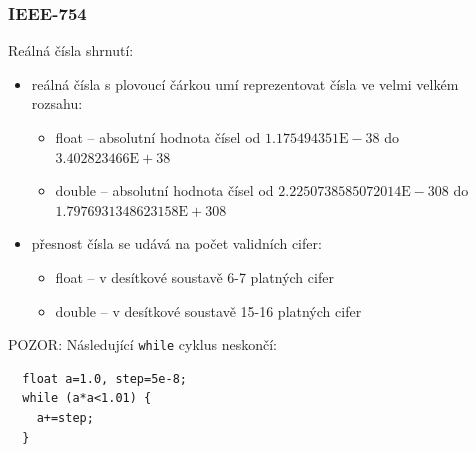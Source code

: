 \begin{frame}[fragile]
\frametitle{IEEE-754}

Reálná čísla shrnutí:
\begin{itemize}
\item reálná čísla s plovoucí čárkou umí reprezentovat čísla ve velmi velkém rozsahu:
\begin{itemize}
\item float -- absolutní hodnota čísel od $1.175494351\text{E}-38$ do $3.402823466\text{E} + 38$
\item double -- absolutní hodnota čísel od $2.2250738585072014\text{E} - 308$ do $1.7976931348623158\text{E} + 308$
\end{itemize}
\item přesnost čísla se udává na počet validních cifer:
\begin{itemize}
\item float -- v desítkové soustavě 6-7 platných cifer
\item double -- v desítkové soustavě 15-16 platných cifer
\end{itemize}
\end{itemize}

POZOR: Následující \texttt{while} cyklus neskončí:
\begin{verbatim}
  float a=1.0, step=5e-8;
  while (a*a<1.01) {
    a+=step;
  }
\end{verbatim}
\end{frame}

